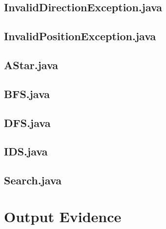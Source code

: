 \documentclass[a4paper]{article}
\begin{document}
\begin{appendices}
    \subsection{InvalidDirectionException.java}
  \label{app:code-InvalidDirectionException}
  

  \subsection{InvalidPositionException.java}
  \label{app:code-InvalidPositionException}
  

  \newpage
  \subsection{AStar.java}
  \label{app:code-AStar}
  

  \newpage
  \subsection{BFS.java}
  \label{app:code-BFS}
  

  \newpage
  \subsection{DFS.java}
  \label{app:code-DFS}
  

  \newpage
  \subsection{IDS.java}
  \label{app:code-IDS}
  

  \newpage
  \subsection{Search.java}
  \label{app:code-Search}
  

  \newpage
  \section{Output Evidence}

\end{appendices}
\end{document}

